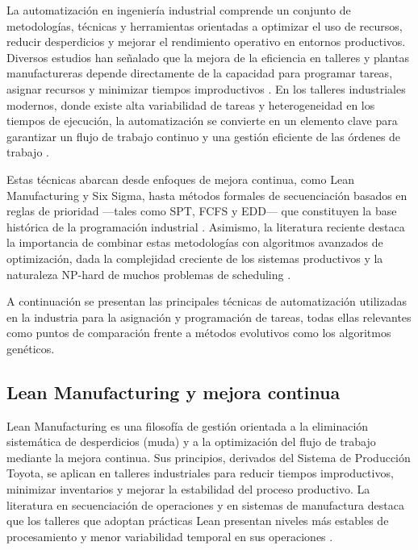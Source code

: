 \begin{sloppypar}
La auto\-matización en in\-geniería industrial comprende un conjunto de metodologías, técnicas y herramientas orientadas a optimizar el uso de recursos, reducir desperdicios y mejorar el rendimiento operativo en entornos productivos. Diversos estudios han señalado que la mejora de la eficiencia en talleres y plantas manu\-factureras depende directamente de la capacidad para programar tareas, asignar recursos y minimizar tiempos improductivos \cite{flowshop,flexjobshop}. En los talleres industriales modernos, donde existe alta variabilidad de tareas y hetero\-geneidad en los tiempos de ejecución, la auto\-matización se convierte en un elemento clave para garantizar un flujo de trabajo continuo y una gestión eficiente de las órdenes de trabajo \cite{industry4}.
\end{sloppypar}

Estas técnicas abarcan desde enfoques de mejora continua, como Lean Manufacturing y Six Sigma, hasta métodos formales de secuenciación basados en reglas de prioridad —tales como SPT, FCFS y EDD— que constituyen la base histórica de la programación industrial \cite{meisel2010}. Asimismo, la literatura reciente destaca la importancia de combinar estas metodologías con algoritmos avanzados de optimización, dada la complejidad creciente de los sistemas productivos y la naturaleza NP-hard de muchos problemas de scheduling \cite{flowshop, industry4}.

A continuación se presentan las principales técnicas de automatización utilizadas en la industria para la asignación y programación de tareas, todas ellas relevantes como puntos de comparación frente a métodos evolutivos como los algoritmos genéticos.

\subsection{Lean Manufacturing y mejora continua}

Lean Manufacturing es una filosofía de gestión orientada a la eliminación sistemática de desperdicios (muda) y a la optimización del flujo de trabajo mediante la mejora continua. Sus principios, derivados del Sistema de Producción Toyota, se aplican en talleres industriales para reducir tiempos improductivos, minimizar inventarios y mejorar la estabilidad del proceso productivo. La literatura en secuenciación de operaciones y en sistemas de manufactura destaca que los talleres que adoptan prácticas Lean presentan niveles más estables de procesamiento y menor variabilidad temporal en sus operaciones \cite{flexjobshop,flowshop}.

